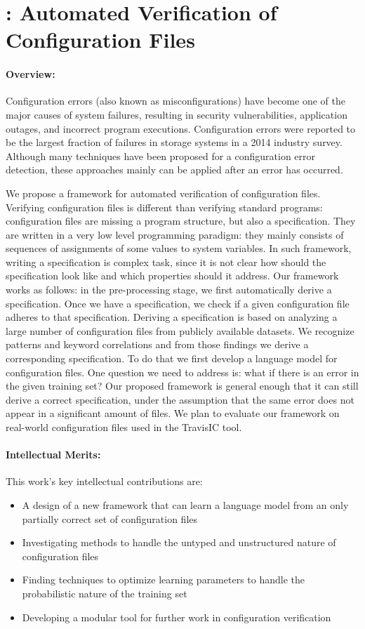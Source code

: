 \section*{\app: Automated Verification of Configuration Files}
\paragraph{Overview:} 
Configuration errors (also known as misconfigurations) have become one of the major causes of system failures, resulting in security vulnerabilities, application outages, and incorrect program executions. 
Configuration errors were reported to be the largest fraction of failures in storage systems in a 2014 industry survey. 
Although many techniques have been proposed for a configuration error detection, these approaches mainly can be applied after an error has occurred.

We propose a framework for automated verification of configuration files. 
Verifying configuration files is different than verifying standard programs: configuration
files are missing a program structure, but also a specification. They are written in a
very low level programming paradigm: they mainly consists of sequences of assignments 
of some 
values to system variables. In such framework, writing a specification is complex task, 
since it is not clear how should the specification look like and which properties should 
it address. Our framework works as follows: in the pre-processing stage, 
we first automatically derive a specification. Once we have a specification, 
we check if a given configuration 
file adheres to that specification.
Deriving a specification is based on analyzing a large number of configuration files from publicly available 
datasets. We recognize patterns and keyword correlations and from those findings we derive 
a corresponding specification. To do that we first develop a language model for configuration files. One question we 
need to address is: what if there is an error in the given training set? Our proposed framework 
is general enough that it can still derive a correct specification, under 
the assumption that the same error does not appear in a significant amount of files.
We plan to evaluate our framework on real-world configuration files 
used in the TravisIC tool.

\paragraph{Intellectual Merits:} This work's key intellectual contributions are:
\begin{itemize}
\item A design of a new framework that can learn a language model from an only partially correct set of configuration files
\item Investigating methods to handle the untyped and unstructured nature of configuration files
\item Finding techniques to optimize learning parameters to handle the probabilistic nature of the training set
\item Developing a modular tool for further work in configuration verification
\end{itemize}

